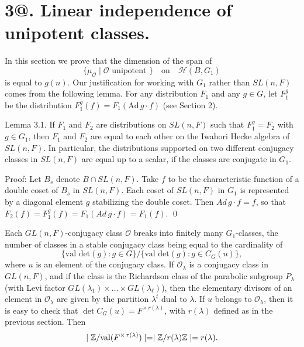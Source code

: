 \documentclass{amsart}
\begin{document}
\section{{\bf 3@.  Linear independence of unipotent classes.}}

\medskip
\noindent
In this section we prove that the dimension of the span of
%
$$
  \{ \mu_{\mathcal O} \mid
     {\mathcal O} \text{ unipotent } \} 
  \quad \text{on} \quad
  {\mathcal H} (B, G_1)
$$
%
is equal to 
  $ g(n) $.  Our justification for working with $G_1$ rather
  than $SL(n,F)$ comes from the following lemma.
  For any distribution $F_1$ and any $g\in G$, let $F^g_1$ be the distribution
  $F^g_1(f) = F_1(\text{Ad}\,g\cdot f)$ (see Section 2).

\proclaim Lemma {3.1}.
If
  $ {F}_1$ and ${F}_2 $
are distributions on 
  $ SL(n,F) $
such that
  $ {F}_1^g = 
    {F}_2 $
with $g\in G_1$, then
  $ F_1$ and $F_2$ 
are equal to each other on
the Iwahori Hecke algebra of $SL(n,F)$.
In particular, the distributions supported on two different conjugacy
classes in $SL(n,F)$ are equal up to a scalar, if the classes are
conjugate in $G_1$.
\finishproclaim

\pproclaim Proof:
Let $B_s$ denote $B\cap SL(n,F)$.
Take
  $f$ to be the characteristic function of 
  a double coset of $B_s$ in $SL(n,F)$.
  Each coset of $SL(n,F)$ in $G_1$ is represented by a diagonal element
  $g$ stabilizing the double coset.
Then
  $ Ad \, g \cdot f = f $,
so that
  $ F_2 (f) =
    F_1^g (f) =
    F_1 (Ad \, g \cdot f) =
    F_1 (f) $.
\qed
\finishpproclaim

Each $GL(n,F)$-conjugacy class
  $ {\mathcal O} $
breaks into finitely many 
  $ G_1 $-classes, the
  number of classes in a stable conjugacy class
  being equal to the cardinality of
%
$$
  \bigl\{
    \text{val det}(g):
    g \in G
  \bigr\}
  \big/
  \bigl\{
    \text{val det}(g):
    g \in C_{G} (u)
  \bigr\},
$$
%
where $u$ is an element of the conjugacy class.
If 
  $ {\mathcal O}_{\lambda} $
is a conjugacy class in $GL(n,F)$, and if the class is 
the Richardson class of the
  parabolic subgroup 
  $ P_{\lambda} $
(with Levi factor
  $ GL (\lambda_1) \times \dots \times GL(\lambda_{\ell}) $),
then the elementary divisors of an element in
  $ {\mathcal O}_{\lambda} $
are given by the partition $\lambda^t$ dual to $\lambda$.  
If $u$ belongs to ${\mathcal O}_\lambda$, then it is easy to check that
  $ \det C_G (u) = F^{\times\,r(\lambda)} $,
with
  $ r(\lambda) $
defined as in the previous section.
Then
%
$$
  \mid 
      {\Bbb Z} / \text{val}(F^{\times\,r(\lambda)})
     \mid =
  \mid 
      {\Bbb Z} / r(\lambda) {\Bbb Z}
      \mid
     = r(\lambda) .
$$
%
\end{document}
